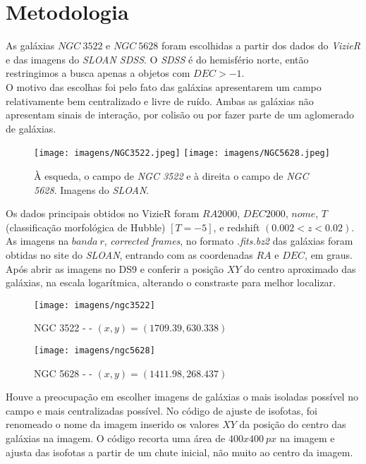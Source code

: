 \documentclass[a4paper, 11pt, fleqn, leqno]{article}
\begin{document}
\section{Metodologia}

\noindent As galáxias $NGC ~ 3522$ e $NGC ~ 5628$ foram escolhidas a partir dos dados do \textit{VizieR} e das imagens do \textit{SLOAN SDSS}. O \textit{SDSS} é do hemisfério norte, então restringimos a busca apenas a objetos com $DEC > -1$.\\

\noindent O motivo das escolhas foi pelo fato das galáxias apresentarem um campo relativamente bem centralizado e livre de ruído. Ambas as galáxias não apresentam sinais de interação, por colisão ou por fazer parte de um aglomerado de galáxias. \\

\begin{figure}[H]
	\centering
	\texttt{[image: imagens/NGC3522.jpeg]}
	\qquad
	\texttt{[image: imagens/NGC5628.jpeg]}
	\caption{À esqueda, o campo de \textit{NGC 3522} e à direita o campo de \textit{NGC 5628}. Imagens do \textit{SLOAN}.}
\end{figure}

\noindent Os dados principais obtidos no VizieR foram $RA2000$, $DEC2000$, $nome$, $T$ (classificação morfológica de Hubble) $[T = -5]$, e redshift $(0.002 < z < 0.02)$.\\

\noindent As imagens na $banda ~ r$, \textit{corrected frames}, no formato \textit{.fits.bz2} das galáxias foram obtidas no site do \textit{SLOAN}, entrando com as coordenadas $RA$ e $DEC$, em graus. Após abrir as imagens no DS9 e conferir a posição $XY$ do centro aproximado das galáxias, na escala logarítmica, alterando o constraste para melhor localizar.\\

\begin{figure}[H]
	\centering
	\texttt{[image: imagens/ngc3522]}
	\caption{NGC 3522 - - $(x, y) = (1709.39, 630.338)$}
\end{figure}

\begin{figure}[H]
	\centering
	\texttt{[image: imagens/ngc5628]}
	\caption{NGC 5628 - - $(x, y) = (1411.98, 268.437)$}
\end{figure}

\noindent Houve a preocupação em escolher imagens de galáxias o mais isoladas possível no campo e mais centralizadas possível. No código de ajuste de isofotas, foi renomeado o nome da imagem inserido os valores $XY$ da posição do centro das galáxias na imagem. O código recorta uma área de $400 x 400 ~ px$ na imagem e ajusta das isofotas a partir de um chute inicial, não muito ao centro da imagem. \\
\end{document}
